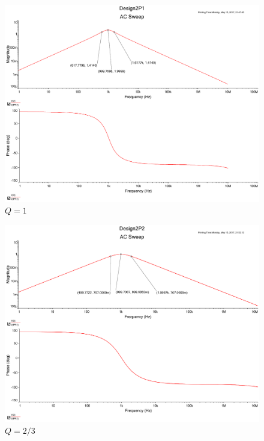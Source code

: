 \documentclass[UTF8,a4paper]{paper}
\begin{document}
\begin{multicols}{2}
\begin{figure}[H]
\centering
\includegraphics[width=\columnwidth]{2P1.pdf}
\caption{$Q=1$}
\label{LQ1}
\end{figure}
\begin{figure}[H]
\centering
\includegraphics[width=\columnwidth]{2P2_3.pdf}
\caption{$Q=2/3$}
\label{PQ23}
\end{figure}
\begin{figure}[H]
\centering

\end{figure}
\end{multicols}
\end{document}
